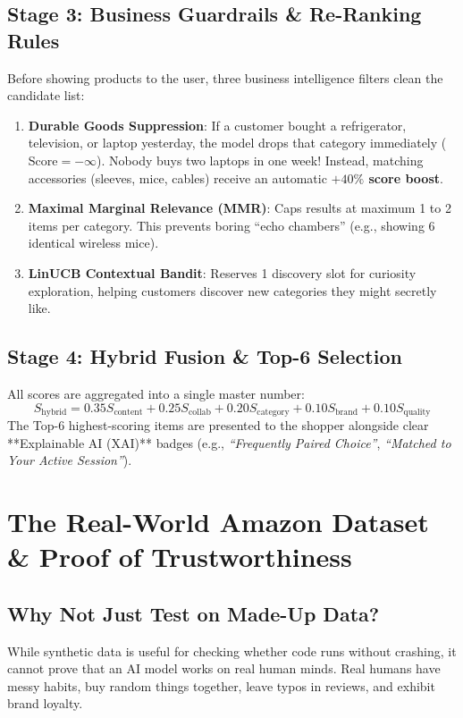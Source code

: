 \documentclass[11pt,a4paper]{article}
\begin{document}
\subsection{Stage 3: Business Guardrails \& Re-Ranking Rules}
Before showing products to the user, three business intelligence filters clean the candidate list:
\begin{enumerate}
    \item \textbf{Durable Goods Suppression}: If a customer bought a refrigerator, television, or laptop yesterday, the model drops that category immediately ($\text{Score} = -\infty$). Nobody buys two laptops in one week! Instead, matching accessories (sleeves, mice, cables) receive an automatic \textbf{$+40\%$ score boost}.
    \item \textbf{Maximal Marginal Relevance (MMR)}: Caps results at maximum 1 to 2 items per category. This prevents boring ``echo chambers'' (e.g., showing 6 identical wireless mice).
    \item \textbf{LinUCB Contextual Bandit}: Reserves 1 discovery slot for curiosity exploration, helping customers discover new categories they might secretly like.
\end{enumerate}

\subsection{Stage 4: Hybrid Fusion \& Top-6 Selection}
All scores are aggregated into a single master number:
\begin{equation}
    S_{\text{hybrid}} = 0.35 S_{\text{content}} + 0.25 S_{\text{collab}} + 0.20 S_{\text{category}} + 0.10 S_{\text{brand}} + 0.10 S_{\text{quality}}
\end{equation}
The Top-6 highest-scoring items are presented to the shopper alongside clear **Explainable AI (XAI)** badges (e.g., \textit{``Frequently Paired Choice''}, \textit{``Matched to Your Active Session''}).

\section{The Real-World Amazon Dataset \& Proof of Trustworthiness}

\subsection{Why Not Just Test on Made-Up Data?}
While synthetic data is useful for checking whether code runs without crashing, it cannot prove that an AI model works on real human minds. Real humans have messy habits, buy random things together, leave typos in reviews, and exhibit brand loyalty.
\end{document}
